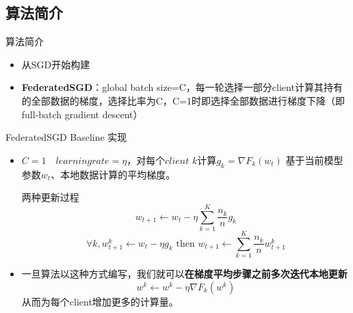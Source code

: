\documentclass{beamer}
\begin{document}
\subsection{算法简介}
\begin{frame}{\songti 算法简介}
    \vspace{80pt}
    \begin{itemize}
        \item 从SGD开始构建
        \item \textbf{FederatedSGD}：global batch size=C，每一轮选择一部分client计算其持有的全部数据的梯度，选择比率为C，C=1时即选择全部数据进行梯度下降（即full-batch gradient descent）
    \end{itemize}
\end{frame}
\begin{frame}{FederatedSGD Baseline {\songti 实现}}
\begin{itemize}
    \item $C=1 \quad learning rate=\eta$，对每个$client\,\, k$计算$g_k=\nabla F_k(w_t)$ 基于当前模型参数$w_t$、本地数据计算的平均梯度。
    
    \begin{minipage}{0.9\textwidth}
    \centering
    \begin{block}{\songti \fontsize{12pt}{9pt}两种更新过程}
        \begin{equation}
            w_{t+1}\leftarrow{{w_{t}}}-{{\eta}}\sum_{k=1}^{K}\frac{n_{k}}{n}{{g_{k}}}
        \end{equation}
        \begin{equation}
            \forall k,w^k_{t+1}\leftarrow w_t-\eta g_k \text{ then } w_{t+1}\leftarrow\sum_{k=1}^K\frac{n_k}{n}w_{t+1}^k
        \end{equation}
    \end{block}
    \end{minipage}  
    \item 一旦算法以这种方式编写，我们就可以\textbf{在梯度平均步骤之前多次迭代本地更新}$$w^k\leftarrow w^k-\eta\nabla F_k(w^k)$$从而为每个client增加更多的计算量。
\end{itemize}
\end{frame}
\end{document}
